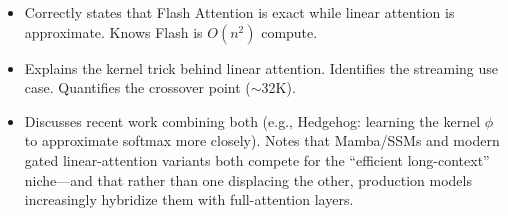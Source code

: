 \begin{interviewq}

\goodgreat
\begin{itemize}
    \item {} Correctly states that Flash Attention is exact while linear attention is approximate. Knows Flash is $O(n^2)$ compute.
    \item {} Explains the kernel trick behind linear attention. Identifies the streaming use case. Quantifies the crossover point ($\sim$32K).
    \item {} Discusses recent work combining both (e.g., Hedgehog: learning the kernel $\phi$ to approximate softmax more closely). Notes that Mamba/SSMs and modern gated linear-attention variants both compete for the ``efficient long-context'' niche---and that rather than one displacing the other, production models increasingly hybridize them with full-attention layers.
\end{itemize}

\end{interviewq}
